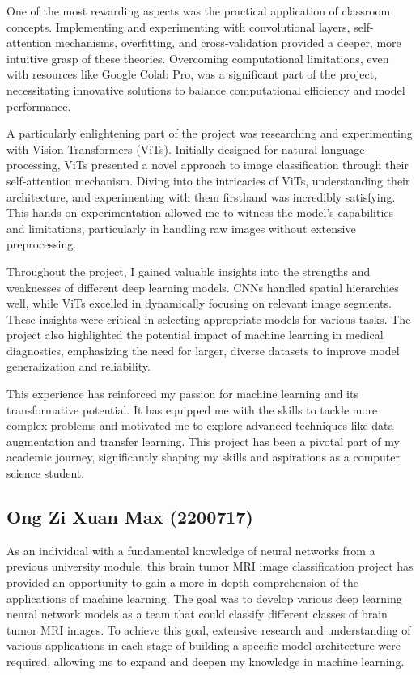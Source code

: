 One of the most rewarding aspects was the practical application of classroom concepts. Implementing and experimenting with convolutional layers, self-attention mechanisms, overfitting, and cross-validation provided a deeper, more intuitive grasp of these theories. Overcoming computational limitations, even with resources like Google Colab Pro, was a significant part of the project, necessitating innovative solutions to balance computational efficiency and model performance.

A particularly enlightening part of the project was researching and experimenting with Vision Transformers (ViTs). Initially designed for natural language processing, ViTs presented a novel approach to image classification through their self-attention mechanism. Diving into the intricacies of ViTs, understanding their architecture, and experimenting with them firsthand was incredibly satisfying. This hands-on experimentation allowed me to witness the model's capabilities and limitations, particularly in handling raw images without extensive preprocessing.

Throughout the project, I gained valuable insights into the strengths and weaknesses of different deep learning models. CNNs handled spatial hierarchies well, while ViTs excelled in dynamically focusing on relevant image segments. These insights were critical in selecting appropriate models for various tasks. The project also highlighted the potential impact of machine learning in medical diagnostics, emphasizing the need for larger, diverse datasets to improve model generalization and reliability.

This experience has reinforced my passion for machine learning and its transformative potential. It has equipped me with the skills to tackle more complex problems and motivated me to explore advanced techniques like data augmentation and transfer learning. This project has been a pivotal part of my academic journey, significantly shaping my skills and aspirations as a computer science student.


\subsection{Ong Zi Xuan Max (2200717)}

As an individual with a fundamental knowledge of neural networks from a previous university module, this brain tumor MRI image classification project has provided an opportunity to gain a more in-depth comprehension of the applications of machine learning. The goal was to develop various deep learning neural network models as a team that could classify different classes of brain tumor MRI images. To achieve this goal, extensive research and understanding of various applications in each stage of building a specific model architecture were required, allowing me to expand and deepen my knowledge in machine learning.

